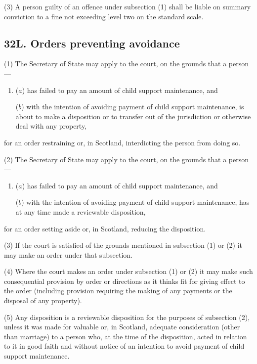 \documentclass[12pt,a4paper]{article}
\begin{document}
(3)
A person guilty of an offence under subsection (1) shall be liable on summary conviction to a fine not exceeding level two on the standard scale.


\subsection{32L. Orders preventing avoidance}

(1) The Secretary of State may apply to the court, on the grounds that a person---
\begin{enumerate}\item[]
($a$) has failed to pay an amount of child support maintenance, and

($b$) with the intention of avoiding payment of child support maintenance, is about to make a disposition or to transfer out of the jurisdiction or otherwise deal with any property,
\end{enumerate}
for an order restraining or, in Scotland, interdicting the person from doing so.

(2) The Secretary of State may apply to the court, on the grounds that a person---
\begin{enumerate}\item[]
($a$) has failed to pay an amount of child support maintenance, and

($b$) with the intention of avoiding payment of child support maintenance, has at any time made a reviewable disposition,
\end{enumerate}
for an order setting aside or, in Scotland, reducing the disposition.

(3)
If the court is satisfied of the grounds mentioned in subsection (1) or (2) it may make an order under that subsection.

(4)
Where the court makes an order under subsection (1) or (2) it may make such consequential provision by order or directions as it thinks fit for giving effect to the order (including provision requiring the making of any payments or the disposal of any property).

(5)
Any disposition is a reviewable disposition for the purposes of subsection (2), unless it was made for valuable or, in Scotland, adequate consideration (other than marriage) to a person who, at the time of the disposition, acted in relation to it in good faith and without notice of an intention to avoid payment of child support maintenance.
\end{document}
